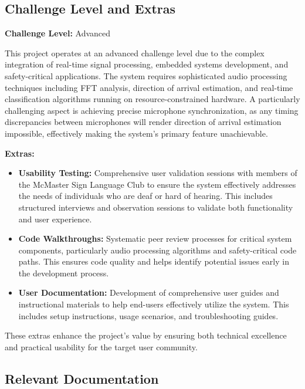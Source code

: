 \documentclass[12pt, titlepage]{article}
\begin{document}
\subsection{Challenge Level and Extras}

\textbf{Challenge Level:} Advanced

This project operates at an advanced challenge level due to the complex
integration of real-time signal processing, embedded systems development, and
safety-critical applications. The system requires sophisticated audio processing
techniques including FFT analysis, direction of arrival estimation, and
real-time classification algorithms running on resource-constrained hardware. A
particularly challenging aspect is achieving precise microphone synchronization,
as any timing discrepancies between microphones will render direction of arrival
estimation impossible, effectively making the system's primary feature
unachievable.

\textbf{Extras:}
\begin{itemize}
    \item \textbf{Usability Testing:} Comprehensive user validation sessions
    with members of the McMaster Sign Language Club to ensure the system
    effectively addresses the needs of individuals who are deaf or hard of
    hearing. This includes structured interviews and observation sessions to
    validate both functionality and user experience.
    
    \item \textbf{Code Walkthroughs:} Systematic peer review processes for
    critical system components, particularly audio processing algorithms and
    safety-critical code paths. This ensures code quality and helps identify
    potential issues early in the development process.
    
    \item \textbf{User Documentation:} Development of comprehensive user guides
    and instructional materials to help end-users effectively utilize the
    system. This includes setup instructions, usage scenarios, and
    troubleshooting guides.
\end{itemize}

These extras enhance the project's value by ensuring both technical excellence
and practical usability for the target user community.

\subsection{Relevant Documentation}
\end{document}
